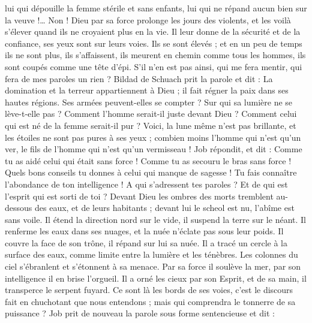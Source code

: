 \begin{multicols}{2}
lui qui dépouille la femme stérile et sans enfants, lui qui ne répand aucun bien sur la veuve !…
Non ! Dieu par sa force prolonge les jours des violents, et les voilà s'élever quand ils ne croyaient plus en la vie.
Il leur donne de la sécurité et de la confiance, ses yeux sont sur leurs voies.
Ils se sont élevés ; et en un peu de temps ils ne sont plus, ils s'affaissent, ils meurent en chemin comme tous les hommes, ils sont coupés comme une tête d'épi.
S'il n'en est pas ainsi, qui me fera mentir, qui fera de mes paroles un rien ?
\VerseOne{}Bildad de Schuach prit la parole et dit :
La domination et la terreur appartiennent à Dieu ; il fait régner la paix dans ses hautes régions.
Ses armées peuvent-elles se compter ? Sur qui sa lumière ne se lève-t-elle pas ?
Comment l'homme serait-il juste devant Dieu ? Comment celui qui est né de la femme serait-il pur ?
Voici, la lune même n'est pas brillante, et les étoiles ne sont pas pures à ses yeux ;
combien moins l'homme qui n'est qu'un ver, le fils de l'homme qui n'est qu'un vermisseau !
\VerseOne{}Job répondit, et dit :
Comme tu as aidé celui qui était sans force ! Comme tu as secouru le bras sans force !
Quels bons conseils tu donnes à celui qui manque de sagesse ! Tu fais connaître l'abondance de ton intelligence !
A qui s'adressent tes paroles ? Et de qui est l'esprit qui est sorti de toi ?
Devant Dieu les ombres des morts tremblent au-dessous des eaux, et de leurs habitants ;
devant lui le scheol est nu, l'abîme est sans voile.
Il étend la direction nord sur le vide, il suspend la terre sur le néant.
Il renferme les eaux dans ses nuages, et la nuée n'éclate pas sous leur poids.
Il couvre la face de son trône, il répand sur lui sa nuée.
Il a tracé un cercle à la surface des eaux, comme limite entre la lumière et les ténèbres.
Les colonnes du ciel s'ébranlent et s'étonnent à sa menace.
Par sa force il soulève la mer, par son intelligence il en brise l'orgueil.
Il a orné les cieux par son Esprit, et  de sa main, il transperce le serpent fuyard.
Ce sont là les bords de ses voies, c'est le discours fait en chuchotant que nous entendons ; mais qui comprendra le tonnerre de sa puissance ?
\VerseOne{}Job prit de nouveau la parole sous forme sentencieuse et dit :

\end{multicols}
